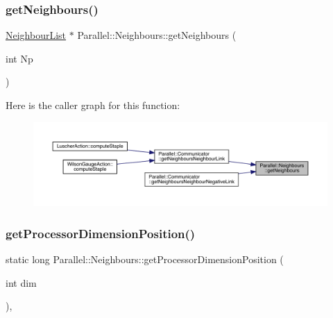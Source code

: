 \subsubsection{\texorpdfstring{getNeighbours()}{getNeighbours()}}
{\footnotesize\ttfamily \mbox{\hyperlink{struct_neighbour_list}{Neighbour\+List}} $\ast$ Parallel\+::\+Neighbours\+::get\+Neighbours (\begin{DoxyParamCaption}\item[{int}]{Np }\end{DoxyParamCaption})\hspace{0.3cm}{\ttfamily [static]}}

Here is the caller graph for this function\+:\nopagebreak
\begin{figure}[H]
\begin{center}
\leavevmode
\includegraphics[width=350pt]{class_parallel_1_1_neighbours_a246afc374290bb0d3e86c07892872392_icgraph}
\end{center}
\end{figure}
\mbox{\label{class_parallel_1_1_neighbours_ad1a2a616b4089eded3545faf11409b85}} 
\subsubsection{\texorpdfstring{getProcessorDimensionPosition()}{getProcessorDimensionPosition()}}
{\footnotesize\ttfamily static long Parallel\+::\+Neighbours\+::get\+Processor\+Dimension\+Position (\begin{DoxyParamCaption}\item[{int}]{dim }\end{DoxyParamCaption})\hspace{0.3cm}{\ttfamily [inline]}, {\ttfamily [static]}}

